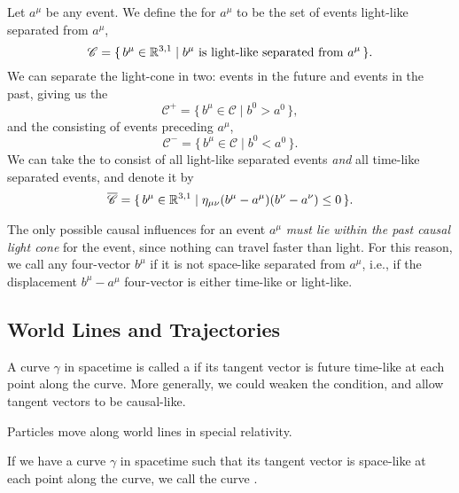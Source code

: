 \begin{definition}\label{defn:relativity:light-cone}
Let $a^{\mu}$ be any event. We define the  for $a^{\mu}$
to be the set of events light-like separated from $a^{\mu}$,
\begin{equation}
\mathscr{C} = \{\,b^{\mu}\in\mathbb{R}^{3,1} \mid b^{\mu}~\mbox{is light-like separated from}~a^{\mu}\,\}.
\end{equation}
We can separate the light-cone in two: events in the future and events
in the past, giving us the 
\begin{equation}
\mathscr{C}^{+} = \{\,b^{\mu}\in\mathscr{C} \mid b^{0} > a^{0}\,\},
\end{equation}
and the  consisting of events preceding $a^{\mu}$,
\begin{equation}
\mathscr{C}^{-} = \{\,b^{\mu}\in\mathscr{C} \mid b^{0} < a^{0}\,\}.
\end{equation}
We can take the  to consist of all light-like
separated events \emph{and} all time-like separated events, and denote
it by
\begin{equation}
\overline{\mathscr{C}} = \{\,b^{\mu}\in\mathbb{R}^{3,1} \mid \eta_{\mu\nu}(b^{\mu}-a^{\mu})(b^{\nu}-a^{\nu})\leq0\,\}.
\end{equation}
\end{definition}

\M
The only possible causal influences for an event $a^{\mu}$
\emph{must lie within the past causal light cone} for the event, since
nothing can travel faster than light. For this reason, we call any
four-vector $b^{\mu}$  if it is not space-like
separated from $a^{\mu}$, i.e., if the displacement $b^{\mu} - a^{\mu}$
four-vector is either time-like or light-like.

\subsection{World Lines and Trajectories}

A curve $\gamma$ in spacetime is called a 
if its tangent vector is future time-like at each point along the
curve. More generally, we could weaken the condition, and allow tangent
vectors to be causal-like.

Particles move along world lines in special relativity.

\M
If we have a curve $\gamma$ in spacetime such that its tangent vector is
space-like at each point along the curve, we call the curve
.

